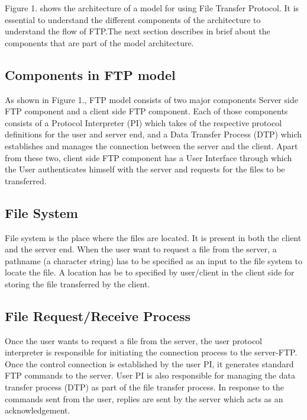 \documentclass[9pt,twocolumn,twoside]{styles/osajnl}
\begin{document}
Figure 1. shows the architecture of a model for using File Transfer Protocol. It is essential to understand the different components of the architecture to understand the flow of FTP.The next section describes in brief about the components that are part of the model architecture.

\subsection{Components in FTP model}
As shown in Figure 1., FTP model consists of two major components Server side FTP component and a client side FTP component. Each of those components consists of a Protocol Interpreter (PI) which takes of the respective protocol definitions for the user and server end, and a Data Transfer Process (DTP) which establishes and manages the connection between the server and the client. Apart from these two, client side FTP component has a User Interface through which the User authenticates himself with the server and requests for the files to be transferred.

\subsection{File System}
File system is the place where the files are located. It is present in both the client and the server end. When the user want to request a file from the server, a pathname (a character string) has to be specified as an input to the file system to locate the file. A location has be to specified by user/client in the client side for storing the file transferred by the client. 

\subsection{File Request/Receive Process}
Once the user wants to request a file from the server, the user protocol interpreter is responsible for initiating the connection process to the server-FTP. Once the control connection is established by the user PI, it generates standard FTP commands to the server. User PI is also responsible for managing the data transfer process (DTP) as part of the file transfer process. In response to the commands sent from the user, replies are sent by the server which acts as an acknowledgement.\\
\end{document}
